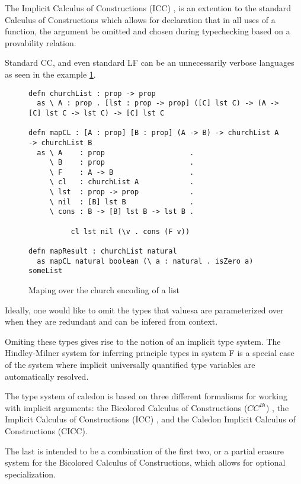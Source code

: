 The Implicit Calculus of Constructions (ICC) \citep{pollack1990implicit}, 
is an extention to the standard Calculus of Constructions which allows
for declaration that in all uses of a function, the argument be omitted 
and chosen during typechecking based on a provability relation.

Standard CC, and even standard LF 
can be an unnecessarily verbose languages as seen in the example \ref{code:long}.

\begin{figure}[h]
\begin{lstlisting}
defn churchList : prop -> prop
  as \ A : prop . [lst : prop -> prop] ([C] lst C) -> (A -> [C] lst C -> lst C) -> [C] lst C

defn mapCL : [A : prop] [B : prop] (A -> B) -> churchList A -> churchList B
  as \ A    : prop                    . 
     \ B    : prop                    .
     \ F    : A -> B                  . 
     \ cl   : churchList A            .
     \ lst  : prop -> prop            .
     \ nil  : [B] lst B               .
     \ cons : B -> [B] lst B -> lst B .

          cl lst nil (\v . cons (F v))

defn mapResult : churchList natural
  as mapCL natural boolean (\ a : natural . isZero a) someList

\end{lstlisting}
\caption{Maping over the church encoding of a list}
\label{code:long}
\end{figure}

Ideally, one would like to omit the types that valuesa are parameterized over when they are redundant
and can be infered from context. 

Omiting these types gives rise to the notion of an implicit type system.  
The Hindley-Milner \citep{hindley1969principal} system for inferring principle types in system F
is a special case of the system where implicit universally quantified type variables are automatically
resolved.

The type system of caledon is based on three different formalisms for working with implicit arguments:  
the Bicolored Calculus of Constructions ($CC^{Bi}$) \citep{luther2001more}, 
the Implicit Calculus of Constructions (ICC) \citep{miquel2001implicit}, 
and the Caledon Implicit Calculus of Constructions (CICC).

The last is intended to be a combination of the first two, or a partial 
erasure system for the Bicolored Calculus of Constructions, 
which allows for optional specialization.